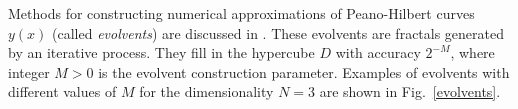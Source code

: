 \documentclass[
11pt,%
tightenlines,%
twoside,%
onecolumn,%
nofloats,%
nobibnotes,%
nofootinbib,%
superscriptaddress,%
noshowpacs,%
centertags]%
{revtex4}
\begin{document}
Methods for constructing numerical approximations of Peano-Hilbert curves $y(x)$ (called \textit{evolvents}) are discussed in \cite{Sergeyev2013}. These evolvents are fractals generated by an iterative process. They fill in the hypercube $D$ with accuracy $2^{-M}$, where integer $M>0$ is the evolvent construction parameter. 
Examples of evolvents with different values of $M$  for the dimensionality $N=3$ are shown in Fig.~\ref{evolvents}.

\begin{figure}
\begin{minipage}{0.4\linewidth}
\end{minipage}
\begin{minipage}{0.4\linewidth}

\end{minipage}
\end{figure}
\end{document}
